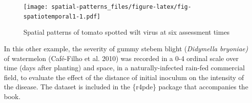 \documentclass[
  letterpaper,
]{book}
\newenvironment{Shaded}{\begin{snugshade}}{\end{snugshade}}
\newcommand{\AttributeTok}[1]{\textcolor[rgb]{0.40,0.45,0.13}{#1}}
\newcommand{\DecValTok}[1]{\textcolor[rgb]{0.68,0.00,0.00}{#1}}
\newcommand{\FunctionTok}[1]{\textcolor[rgb]{0.28,0.35,0.67}{#1}}
\newcommand{\NormalTok}[1]{\textcolor[rgb]{0.00,0.23,0.31}{#1}}
\newcommand{\OtherTok}[1]{\textcolor[rgb]{0.00,0.23,0.31}{#1}}
\newcommand{\SpecialCharTok}[1]{\textcolor[rgb]{0.37,0.37,0.37}{#1}}
\newcommand{\StringTok}[1]{\textcolor[rgb]{0.13,0.47,0.30}{#1}}
\begin{document}
\begin{Shaded}
\end{Shaded}

\begin{figure}

\texttt{[image: spatial-patterns\_files/figure-latex/fig-spatiotemporal1-1.pdf]} \hfill{}

\caption{\label{fig-spatiotemporal1}Spatial patterns of tomato spotted
wilt virus at six assessment times}

\end{figure}

In this other example, the severity of gummy stebem blight
(\emph{Didymella bryoniae)} of watermelon (Café-Filho et al. 2010) was
recorded in a 0-4 ordinal scale over time (days after planting) and
space, in a naturally-infected rain-fed commercial field, to evaluate
the effect of the distance of initial inoculum on the intensity of the
disease. The dataset is included in the \{r4pde\} package that
accompanies the book.
\end{document}
